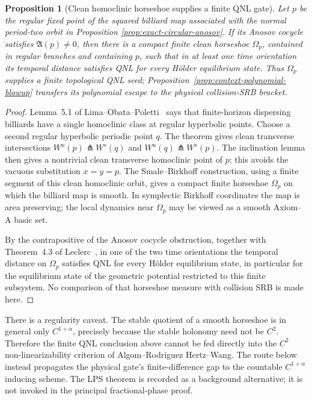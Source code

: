\documentclass[11pt]{article}
\newtheorem{proposition}[theorem]{Proposition}
\begin{document}
\begin{proposition}[Clean homoclinic horseshoe supplies a finite QNL gate]
\label{prop:homoclinic-horseshoe-uni}
Let $p$ be the regular fixed point of the squared billiard map associated with
the normal period-two orbit in Proposition
\ref{prop:exact-circular-anosov}.  If its Anosov cocycle satisfies
$\mathfrak A(p)\ne0$, then there is a compact finite clean horseshoe
$\Omega_p$, contained in regular branches and containing $p$, such that in at
least one time orientation its temporal distance satisfies QNL for every
H\"older equilibrium state.  Thus $\Omega_p$ supplies a finite topological
      QNL seed; Proposition~\ref{prop:context-polynomial-blowup} transfers its
      polynomial escape to the physical collision-SRB bracket.
\end{proposition}

\begin{proof}
Lemma~5.1 of Lima--Obata--Poletti~\cite{LOP} says that finite-horizon
dispersing billiards have a single homoclinic class at regular hyperbolic
points.  Choose a second regular hyperbolic periodic point $q$.  The theorem
gives clean transverse intersections
$W^u(p)\pitchfork W^s(q)$ and $W^u(q)\pitchfork W^s(p)$.  The inclination
lemma then gives a nontrivial clean transverse homoclinic point of $p$; this
avoids the vacuous substitution $x=y=p$.  The Smale--Birkhoff construction, using
a finite segment of this clean homoclinic orbit, gives a compact finite
horseshoe $\Omega_p$ on which the billiard map is smooth.  In symplectic
Birkhoff coordinates the map is area preserving; the local dynamics near
$\Omega_p$ may be viewed as a smooth Axiom--A basic set.

By the contrapositive of the Anosov cocycle obstruction, together with
Theorem~4.3 of Leclerc~\cite{Leclerc2026}, in one of the two time orientations
the temporal distance on $\Omega_p$ satisfies QNL for every H\"older
equilibrium state, in particular for the equilibrium state of the geometric
potential restricted to this finite subsystem.  No comparison of that
horseshoe measure with collision SRB is made here.
\end{proof}

There is a regularity caveat.  The stable quotient of a smooth horseshoe is in
general only $C^{1+\alpha}$, precisely because the stable holonomy need not be
$C^2$.  Therefore the finite QNL conclusion above cannot be fed directly
into the $C^2$ non-linearizability criterion of
Algom--Rodriguez Hertz--Wang.  The route below instead propagates the
physical gate's finite-difference gap to the countable
$C^{1+\alpha}$ inducing scheme.  The LPS theorem is recorded as a background
alternative; it is not invoked in the principal fractional-phase proof.
\end{document}
